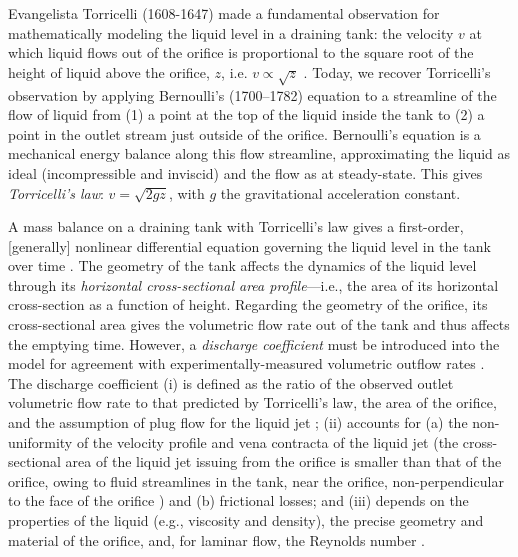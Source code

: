 \documentclass[a4paper,fleqn]{cas-dc}
\begin{document}
Evangelista Torricelli (1608-1647) made a fundamental observation for mathematically modeling the liquid level in a draining tank: 
the velocity $v$ at which liquid flows out of the orifice is proportional to the square root of the height of liquid above the orifice, $z$, i.e. $v\propto \sqrt{z}$ \cite{mills1982newton,dorfman1958life}.
Today, we recover Torricelli's observation by applying Bernoulli's (1700–1782) equation \cite{welty2020fundamentals} to a streamline of the flow of liquid from (1) a point at the top of the liquid inside the tank to (2) a point in the outlet stream just outside of the orifice. 
Bernoulli's equation is a mechanical energy balance along this flow streamline, approximating the liquid as ideal (incompressible and inviscid) and the flow as at steady-state. 
This gives \emph{Torricelli's law}: $v=\sqrt{2 g z}$, with $g$ the gravitational acceleration constant. \cite{d2021torricelli,teoman2022discharge}

A mass balance on a draining tank with Torricelli's law gives a first-order, [generally] nonlinear differential equation governing the liquid level in the tank over time \cite{groetsch1993inverse_tl,seborg2016process,debook}.
The geometry of the tank affects the dynamics of the liquid level through its \emph{horizontal cross-sectional area profile}---i.e., the area of its horizontal cross-section as a function of height.
Regarding the geometry of the orifice, its cross-sectional area gives the volumetric flow rate out of the tank and thus affects the emptying time.
However, a \emph{discharge coefficient} \cite{de2000pin,blasone2015discharge,wadhwa2021study,liu2008drainage} must be introduced into the model for agreement with experimentally-measured volumetric outflow rates \cite{farmer1992physical,driver1998torricelli,brady2009siphons,rother2024modelling,paldy1963apparatus,ivanov2014testing,williams2021vessel,pavesi2019investigating,planinvsivc2011holes,saleta2005experimental,lopac2015water,powell2012carrying,maranni2021exploring}.
The discharge coefficient \cite{teoman2022discharge,hicks2014determining,blasone2015discharge,lienhard1984velocity,wadhwa2021study}
(i) is defined as the ratio of the observed outlet volumetric flow rate to that predicted by Torricelli's law, the area of the orifice, and the assumption of plug flow for the liquid jet \cite{hicks2014determining};
(ii) accounts for 
   (a) the non-uniformity of the velocity profile and vena contracta of the liquid jet (the cross-sectional area of the liquid jet issuing from the orifice is smaller than that of the orifice, owing to fluid streamlines in the tank, near the orifice, non-perpendicular to the face of the orifice \cite{horsch2020simple}) and 
   (b) frictional losses; and
(iii) depends on the properties of the liquid (e.g., viscosity and density), the precise geometry and material of the orifice, and, for laminar flow, the Reynolds number \cite{teoman2022discharge,ferrand2016wetting}. 
\end{document}
